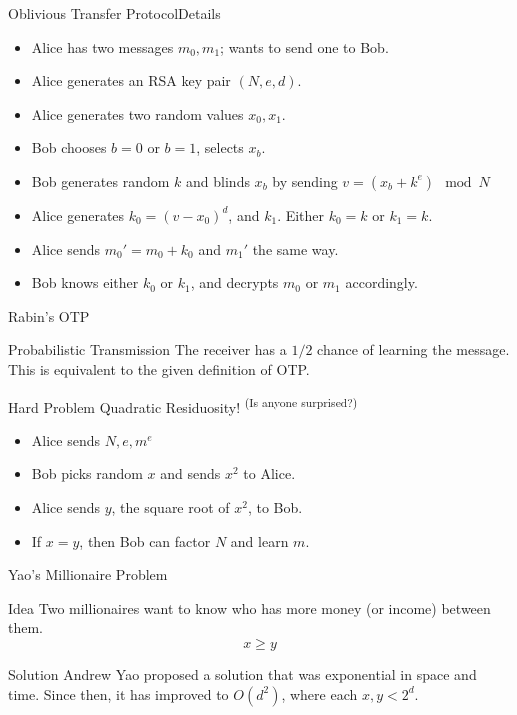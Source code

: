 \documentclass[12pt]{beamer}
\begin{document}
\begin{frame}{Oblivious Transfer Protocol}{Details}
	\begin{itemize}
		\item Alice has two messages $m_0, m_1$; wants to send one to Bob.
		\item Alice generates an RSA key pair $(N, e, d)$.
		\item Alice generates two random values $x_0, x_1$.
		\item Bob chooses $b = 0$ or $b = 1$, selects $x_b$.
		\item Bob generates random $k$ and blinds $x_b$ by sending $v = (x_b +
			k^e) \mod N$
		\item Alice generates $k_0 = (v - x_0)^d$, and $k_1$. Either
			$k_0=k$ or $k_1=k$.
		\item Alice sends $m_0' = m_0 + k_0$ and $m_1'$ the same way.
		\item Bob knows either $k_0$ or $k_1$, and decrypts $m_0$ or $m_1$
			accordingly.
	\end{itemize}
\end{frame}

\begin{frame}{Rabin's OTP}
	\begin{block}{Probabilistic Transmission}
		The receiver has a $1/2$ chance of learning the message. This is
		equivalent to the given definition of OTP.
	\end{block}

	\begin{block}{Hard Problem}
		\centering
		Quadratic Residuosity! \small\textsuperscript{(Is anyone surprised?)}
	\end{block}

	\begin{itemize}
		\item Alice sends $N, e, m^e$
		\item Bob picks random $x$ and sends $x^2$ to Alice.
		\item Alice sends $y$, the square root of $x^2$, to Bob.
		\item If $x = y$, then Bob can factor $N$ and learn $m$.
	\end{itemize}
\end{frame}

\begin{frame}{Yao's Millionaire Problem}
	\begin{block}{Idea}
		Two millionaires want to know who has more money (or income) between them.
		\[ x \geq y \]
	\end{block}

	\begin{block}{Solution}
		Andrew Yao proposed a solution that was exponential in space and time.
		Since then, it has improved to $O(d^2)$, where each $x,y < 2^d$.
	\end{block}
\end{frame}
\end{document}
